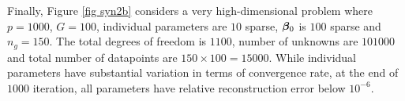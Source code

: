 	
Finally, Figure \ref{fig syn2b} considers a very high-dimensional problem where $p=1000$, $G=100$, individual parameters are $10$ sparse, $\boldsymbol{\beta}_0$ is $100$ sparse and $n_g=150$. The total degrees of freedom is $1100$, number of unknowns are $101000$ and total number of datapoints are $150\times 100=15000$. While individual parameters have substantial variation in terms of convergence rate, at the end of $1000$ iteration, all parameters have relative reconstruction error below $10^{-6}$.
%			
%			
%	
%			
%			



